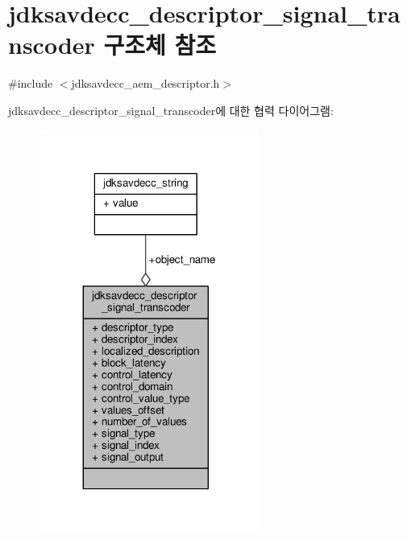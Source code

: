\hypertarget{structjdksavdecc__descriptor__signal__transcoder}{}\section{jdksavdecc\+\_\+descriptor\+\_\+signal\+\_\+transcoder 구조체 참조}
\label{structjdksavdecc__descriptor__signal__transcoder}


{\ttfamily \#include $<$jdksavdecc\+\_\+aem\+\_\+descriptor.\+h$>$}



jdksavdecc\+\_\+descriptor\+\_\+signal\+\_\+transcoder에 대한 협력 다이어그램\+:
\nopagebreak
\begin{figure}[H]
\begin{center}
\leavevmode
\includegraphics[width=203pt]{structjdksavdecc__descriptor__signal__transcoder__coll__graph}
\end{center}
\end{figure}
